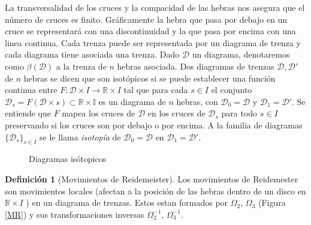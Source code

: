 \documentclass[12pt]{article}
\theoremstyle{definition}
\newtheorem{defi}{Definición}[section]
\begin{document}
La transversalidad de los cruces y la compacidad de las hebras nos asegura que el número de cruces es finito. Gráficamente la hebra que pasa por debajo en un cruce se representará con una discontinuidad y la que pasa por encima con una linea continua. Cada trenza puede ser representada por un diagrama de trenza y cada diagrama tiene asociada una trenza. Dado $\mathcal{D}$ un diagrama, denotaremos como $\beta(\mathcal{D})$ a la trenza de $n$ hebras asociada.
\newline
\newline
Dos diagramas de trenzas $\mathcal{D}, \mathcal{D}'$ de $n$ hebras se dicen que son isotópicos si se puede establecer una función continua entre $F:\mathcal{D}\times I\rightarrow\mathbb{R}\times I$ tal que para cada $s\in I$ el conjunto $\mathcal{D}_s = F(\mathcal{D}\times s)\subset\mathbb{R\times I}$ es un diagrama de $n$ hebras, con $\mathcal{D}_0 = \mathcal{D}$ y $\mathcal{D}_1 = \mathcal{D}'$. Se entiende que $F$ mapea los cruces de $\mathcal{D}$ en los cruces de $\mathcal{D}_s$ para todo $s\in I$ preservando si los cruces son por debajo o por encima. A la familia de diagramas $\{\mathcal{D}_s\}_{s\in I}$ se le llama \textit{isotopía} de $\mathcal{D}_0 = \mathcal{D}$ en $\mathcal{D}_1 = \mathcal{D}'$.




\begin{figure}[h!]
\centering
{}
\caption{Diagramas isótopicos}
\end{figure}







\begin{defi}[Movimientos de Reidemeister]  Los movimientos de Reidemester  son movimientos locales (afectan a la posición de las hebras dentro de un disco en 
$ \mathbb{R}\times I $ ) en un diagrama de trenzas. Estos estan formados por $\Omega_2$, $\Omega_3$ (Figura \ref{MR}) y sus transformaciones inversas
$\Omega_2^{-1}$, $\Omega_3^{-1}$. 

\end{defi}
\end{document}

